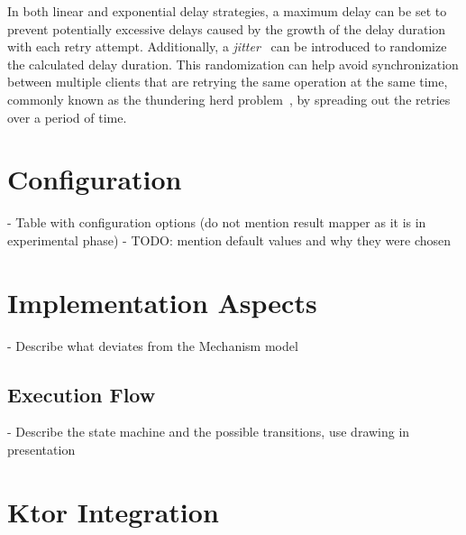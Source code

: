 In both linear and exponential delay strategies, a maximum delay can be set to prevent potentially excessive delays caused by the growth of the delay duration with each retry attempt.
Additionally, a \textit{jitter}~\cite{wiki:jitter} can be introduced to randomize the calculated delay duration.
This randomization can help avoid synchronization between multiple clients that are retrying the same operation at the same time, commonly known as the thundering herd problem~\cite{wiki:thundering-herd-problem}, by spreading out the retries over a period of time.

\section{Configuration}\label{sec:retry-configuration}

- Table with configuration options (do not mention result mapper as it is in experimental phase)
- TODO: mention default values and why they were chosen

\section{Implementation Aspects}\label{sec:retry-implementation-aspects}
- Describe what deviates from the Mechanism model

\subsection{Execution Flow}\label{subsec:retry-execution-flow}

- Describe the state machine and the possible transitions, use drawing in presentation

\section{Ktor Integration}\label{sec:retry-ktor-integration}
